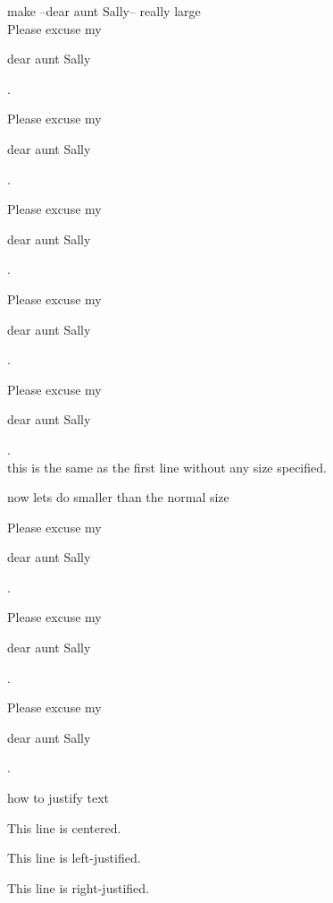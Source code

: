 \documentclass[11pt]{article}
\begin{document}
make --dear aunt Sally-- really large\\

Please excuse my \begin{large}dear aunt Sally\end{large}.

Please excuse my \begin{Large}dear aunt Sally\end{Large}.

Please excuse my \begin{huge}dear aunt Sally\end{huge}.

Please excuse my \begin{Huge}dear aunt Sally\end{Huge}.

Please excuse my \begin{normalsize}dear aunt Sally\end{normalsize}.\\
this is the same as the first line without any size specified.\\

\vspace{1cm}

now lets do smaller than the normal size

Please excuse my \begin{small}dear aunt Sally\end{small}.

Please excuse my \begin{scriptsize}dear aunt Sally\end{scriptsize}.

Please excuse my \begin{tiny}dear aunt Sally\end{tiny}.

\vspace{2cm}

how to justify text\\

\begin{center}This line is centered.\end{center}

\begin{flushleft}This line is left-justified.\end{flushleft}

\begin{flushright}This line is right-justified.\end{flushright}
\end{document}
